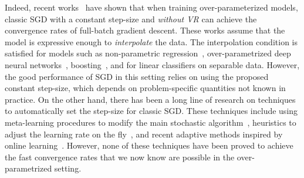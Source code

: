 {Indeed, recent works~\cite{vaswani2019fast,ma2018power,bassily2018exponential,liu2018mass, cevher2018linear, jain2017accelerating, schmidt2013fast} have shown that when training over-parameterized models, classic SGD with a constant step-size and \emph{without VR} can achieve the convergence rates of full-batch gradient descent. These works assume that the model is expressive enough to \emph{interpolate} the data. The interpolation condition is satisfied for models such as non-parametric regression~\cite{liang2018just,belkin2019does}, over-parametrized deep neural networks~\cite{zhang2016understanding}, boosting~\cite{schapire1998boosting}, and for linear classifiers on separable data. However, the good performance of SGD in this setting relies on using the proposed constant step-size, which depends on problem-specific quantities not known in practice. On the other hand, there has been a long line of research on techniques to automatically set the step-size for classic SGD. These techniques include using meta-learning procedures to modify the main stochastic algorithm~\cite{baydin2017online,yu2006fast,schraudolph1999local,almeida1998parameter,plagianakos2001learning,yu2006fast,shao2000rates}, heuristics to adjust the learning rate on the fly~\cite{kushner1995stochastic, deylon1993accelerated, schaul2013no, schoenauer2017stochastic}, and recent adaptive methods inspired by online learning~\cite{duchi2011adaptive,zeiler2012adadelta,kingma2014adam,reddi2019convergence, orabona2017training,rolinek2018l4, luo2019adaptive}. However, none of these techniques have been proved to achieve the fast convergence rates that we now know are possible in the over-parametrized setting.

}
